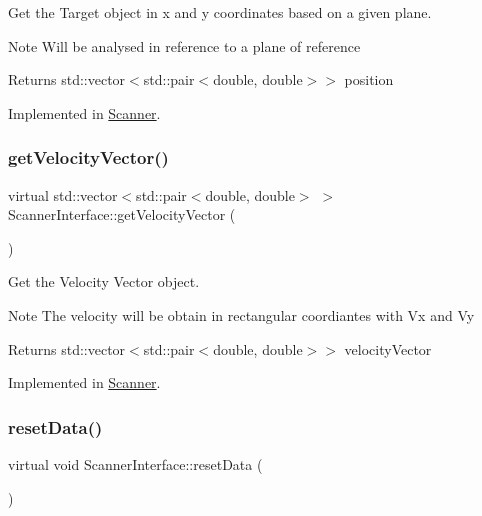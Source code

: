 Get the Target object in x and y coordinates based on a given plane. 

\begin{DoxyNote}{Note}
Will be analysed in reference to a plane of reference 
\end{DoxyNote}
\begin{DoxyReturn}{Returns}
std\+::vector$<$std\+::pair$<$double, double$>$$>$ position 
\end{DoxyReturn}


Implemented in \hyperlink{classScanner_a556ac0598666bf9543099daef4655d6b}{Scanner}.

\mbox{\label{classScannerInterface_a9dce1c9696b08fc10a1db681a479b0a9}} 
\subsubsection{\texorpdfstring{get\+Velocity\+Vector()}{getVelocityVector()}}
{\footnotesize\ttfamily virtual std\+::vector$<$std\+::pair$<$double, double$>$ $>$ Scanner\+Interface\+::get\+Velocity\+Vector (\begin{DoxyParamCaption}{ }\end{DoxyParamCaption})\hspace{0.3cm}{\ttfamily [pure virtual]}}



Get the Velocity Vector object. 

\begin{DoxyNote}{Note}
The velocity will be obtain in rectangular coordiantes with Vx and Vy 
\end{DoxyNote}
\begin{DoxyReturn}{Returns}
std\+::vector$<$std\+::pair$<$double, double$>$$>$ velocity\+Vector 
\end{DoxyReturn}


Implemented in \hyperlink{classScanner_aa551cad3b1137f4fbe052181f09f987f}{Scanner}.

\mbox{\label{classScannerInterface_a32a25bd134d2d346e3652eea3180ea7b}} 
\subsubsection{\texorpdfstring{reset\+Data()}{resetData()}}
{\footnotesize\ttfamily virtual void Scanner\+Interface\+::reset\+Data (\begin{DoxyParamCaption}{ }\end{DoxyParamCaption})\hspace{0.3cm}{\ttfamily [pure virtual]}}



